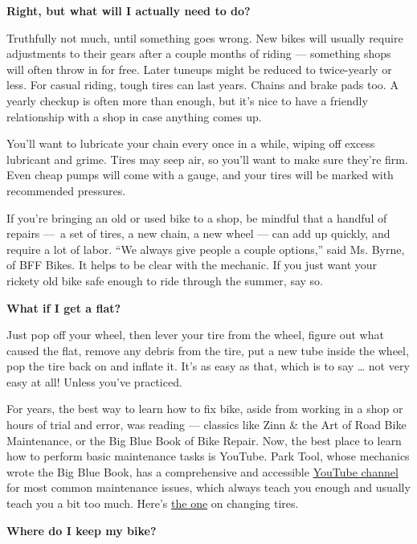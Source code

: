 \textbf{Right, but what will I actually need to do?}

Truthfully not much, until something goes wrong. New bikes will usually
require adjustments to their gears after a couple months of riding ---
something shops will often throw in for free. Later tuneups might be
reduced to twice-yearly or less. For casual riding, tough tires can last
years. Chains and brake pads too. A yearly checkup is often more than
enough, but it's nice to have a friendly relationship with a shop in
case anything comes up.

You'll want to lubricate your chain every once in a while, wiping off
excess lubricant and grime. Tires may seep air, so you'll want to make
sure they're firm. Even cheap pumps will come with a gauge, and your
tires will be marked with recommended pressures.

If you're bringing an old or used bike to a shop, be mindful that a
handful of repairs ---~a set of tires, a new chain, a new wheel --- can
add up quickly, and require a lot of labor. ``We always give people a
couple options,'' said Ms. Byrne, of BFF Bikes. It helps to be clear
with the mechanic. If you just want your rickety old bike safe enough to
ride through the summer, say so.

\textbf{What if I get a flat?}

Just pop off your wheel, then lever your tire from the wheel, figure out
what caused the flat, remove any debris from the tire, put a new tube
inside the wheel, pop the tire back on and inflate it. It's as easy as
that, which is to say \ldots{} not very easy at all! Unless you've
practiced.

For years, the best way to learn how to fix bike, aside from working in
a shop or hours of trial and error, was reading --- classics like Zinn
\& the Art of Road Bike Maintenance, or the Big Blue Book of Bike
Repair. Now, the best place to learn how to perform basic maintenance
tasks is YouTube. Park Tool, whose mechanics wrote the Big Blue Book,
has a comprehensive and accessible
\href{https://www.youtube.com/channel/UCzaZ1sPWEuZN-I8_XT6AH8g}{YouTube
channel} for most common maintenance issues, which always teach you
enough and usually teach you a bit too much. Here's
\href{https://www.youtube.com/watch?v=eqR6nlZNeU8}{the one} on changing
tires.

\textbf{Where do I keep my bike?}

